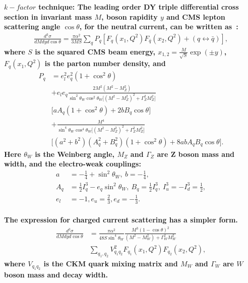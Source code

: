 \begin{description}
\item \bf {$k-factor$ technique:} \rm
The leading order DY triple differential cross section in
invariant mass \(M\), boson rapidity \(y\) and CMS
lepton scattering angle \(\cos\theta\), for the neutral current, 
can be written as~\cite{Drell:1970wh,Yamada:1981mw}:
\begin{align}
 \frac{d^3\sigma}{dM{d}y d\cos\theta} =  
 \frac{\pi\alpha^2}{3MS}\sum_{q}P_q \left[F_q(x_1,Q^2)F_{\bar{q}}(x_2,Q^2) 
 + (q\leftrightarrow\bar{q})\right],
\end{align}
where \(S\) is the squared CMS beam energy, \(x_{1,2} = \frac{M}{\sqrt{S}}\exp(\pm y)\), $F_q(x_1,Q^2)$ 
is the parton number density, and 
\begin{align}
  P_q &=  e_l^2e_q^2(1+\cos^2\theta) \nonumber \\
      &+  e_le_q\frac{2M^2(M^2-M_Z^2)}{\sin^2\theta_W\cos^2\theta_W
          \big[(M^2-M_Z^2)^2+\Gamma_Z^2M_Z^2\big]} \nonumber \\
      &    \big[aA_q(1+\cos^2\theta)+2bB_q\cos\theta\big] \nonumber \\
      &+  \frac{M^4}{\sin^4\theta_W\cos^4\theta_W
          \big[(M^2-M_Z^2)^2+\Gamma_Z^2M_Z^2\big]} \nonumber \\
      &    \big[(a^2+b^2)(A_q^2+B_q^2)(1+\cos^2\theta)+8abA_qB_q\cos\theta\big].
\end{align}
Here \(\theta_W\) is the Weinberg angle, \(M_Z\) and \(\Gamma_Z\) are Z boson mass and 
width, and the electro-weak couplings:
\begin{align}
 a & = -\frac{1}{4} + \sin^2\theta_W, \  b  = -\frac{1}{4}, \nonumber \\
 A_q & = \frac{1}{2}I_q^3-e_q\sin^2\theta_W, \ B_q  = \frac{1}{2}I_q^3, \ I_u^3  = -I_d^3 = \frac{1}{2},  \nonumber \\
 e_l & = -1, e_u = \frac{2}{3}, e_d = -\frac{1}{3}.
\end{align}
\\
The expression for charged current scattering has a simpler form.
\begin{align}
\frac{d^3\sigma}{dMdyd\cos\theta} &=
 \frac{\pi\alpha^2}{48S\sin^4\theta_W}
 \frac{M^3(1-\cos\theta)^2}{(M^2-M_W^2)+\Gamma_W^2M_W^2}  \nonumber \\
 & \sum_{q_1,q_2}V_{q_1q_2}^2F_{q_1}(x_1,Q^2)F_{q_2}(x_2,Q^2),
\end{align}
where \(V_{q_1q_2}\) is the CKM quark mixing matrix and \(M_W\) and \(\Gamma_W\)
are \(W\) boson mass and decay width.


\end{description}
